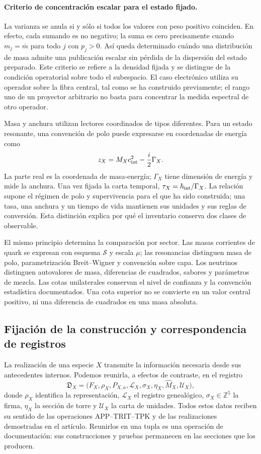 \paragraph{Criterio de concentración escalar para el estado fijado.}
La varianza se anula si y sólo si todos los valores con peso positivo
coinciden. En efecto, cada sumando es no negativo; la suma es cero
precisamente cuando \(m_j=\overline m\) para todo \(j\) con
\(p_j>0\). Así queda determinado cuándo una distribución de masa admite
una publicación escalar sin pérdida de la dispersión del estado preparado.
Este criterio se refiere a la densidad fijada y se distingue de la condición
operatorial sobre todo el subespacio. El caso electrónico utiliza su
operador sobre la fibra central, tal como se ha construido previamente;
el rango uno de un proyector arbitrario no basta para concentrar la medida
espectral de otro operador.

Masa y anchura utilizan lectores coordinados de tipos diferentes. Para un
estado resonante, una convención de polo puede expresarse en coordenadas de
energía como
\[
 z_X=M_Xc_{\rm int}^{2}-\frac{i}{2}\Gamma_X.
\]
La parte real es la coordenada de masa-energía; \(\Gamma_X\) tiene
dimensión de energía y mide la anchura. Una vez fijada la carta temporal,
\(\tau_X=\hbar_{\rm int}/\Gamma_X\). La relación supone el régimen de
polo y supervivencia para el que ha sido construida; una tasa, una anchura y
un tiempo de vida mantienen sus unidades y sus reglas de conversión. Esta
distinción explica por qué el inventario conserva dos clases de observable.

El mismo principio determina la comparación por sector. Las masas corrientes
de quark se expresan con esquema \(\mathscr S\) y escala \(\mu\);
las resonancias distinguen masa de polo, parametrización Breit--Wigner y
convención sobre capa. Los neutrinos distinguen autovalores de masa,
diferencias de cuadrados, sabores y parámetros de mezcla. Las cotas
unilaterales conservan el nivel de confianza y la convención estadística
documentados. Una cota superior no se convierte en un valor central positivo,
ni una diferencia de cuadrados en una masa absoluta.

\subsection{Fijación de la construcción y correspondencia de registros}
\label{subsec:vi-congelacion}

La realización de una especie \(X\) transmite la información necesaria
desde sus antecedentes internos. Podemos reunirla, a efectos de contraste,
en el registro
\[
 \mathfrak D_X=
 \bigl(F_X,\rho_X,P_{X,a},\mathcal L_X,
       \sigma_X,\eta_X,\widehat M_X,\mathcal U_X\bigr),
\]
donde \(\rho_X\) identifica la representación, \(\mathcal L_X\) el
registro genealógico, \(\sigma_X\in\mathbb Z^5\) la firma,
\(\eta_X\) la sección de torre y \(\mathcal U_X\) la carta de
unidades. Todos estos datos reciben su sentido de las operaciones
APP--TRIT--TPK y de las realizaciones demostradas en el artículo. Reunirlos
en una tupla es una operación de documentación: sus construcciones y
pruebas permanecen en las secciones que los producen.

